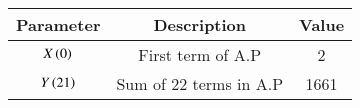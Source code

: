 \renewcommand{\arraystretch}{2}
\begin{tabular}{|c|c|c|}
\hline 
\setlength{\tabcolsep}{1pt}
\textbf{Parameter}  &\textbf{Description} &\textbf{Value} \\
\hline
$X\left(0\right)$ & First term of A.P & 2 \\
\hline
$Y\left(21\right)$ & Sum of 22 terms in A.P & 1661 \\
\hline
\end{tabular}
